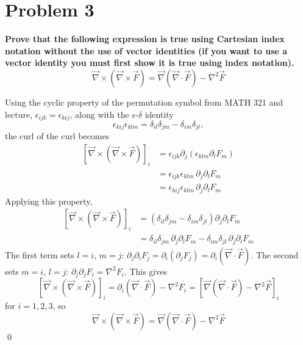 \documentclass[12pt]{article}
\begin{document}
\newpage

\section*{Problem 3}
\textbf{Prove that the following expression is true using Cartesian index notation without the use of vector identities (if you want to use a vector identity you must first show it is true using index notation).}
\begin{equation*}
    \vec\nabla \times \left(\vec\nabla \times \vec F\right) = \vec\nabla\left(\vec\nabla \cdot \vec F\right) - \nabla^2 \vec F
\end{equation*}

Using the cyclic property of the permutation symbol from MATH 321 and lecture, $\epsilon_{ijk} = \epsilon_{kij}$, along with the $\epsilon$-$\delta$ identity
\begin{equation}
    \epsilon_{kij}\epsilon_{klm} = \delta_{il}\delta_{jm} - \delta_{im}\delta_{jl}, \label{eq:epsdelta}
\end{equation}
the curl of the curl becomes
\begin{align*}
    \left[\vec\nabla\times\left(\vec\nabla\times\vec F\right)\right]_i
    &= \epsilon_{ijk}\partial_j\left(\epsilon_{klm}\partial_lF_m\right) \\
    &= \epsilon_{ijk}\epsilon_{klm}\,\partial_j\partial_lF_m \\
    &= \epsilon_{kij}\epsilon_{klm}\,\partial_j\partial_lF_m
\end{align*}
Applying this property,
\begin{align*}
    \left[\vec\nabla\times\left(\vec\nabla\times\vec F\right)\right]_i
    &= \left(\delta_{il}\delta_{jm} - \delta_{im}\delta_{jl}\right)\partial_j\partial_lF_m \\
    &= \delta_{il}\delta_{jm}\,\partial_j\partial_lF_m - \delta_{im}\delta_{jl}\,\partial_j\partial_lF_m
\end{align*}
The first term sets $l=i$, $m=j$: $\partial_j\partial_iF_j = \partial_i\left(\partial_jF_j\right) = \partial_i\left(\vec\nabla\cdot\vec F\right)$. The second sets $m=i$, $l=j$: $\partial_j\partial_jF_i = \nabla^2F_i$. This gives
\begin{equation*}
    \left[\vec\nabla\times\left(\vec\nabla\times\vec F\right)\right]_i = \partial_i\left(\vec\nabla\cdot\vec F\right) - \nabla^2F_i = \left[\vec\nabla\left(\vec\nabla\cdot\vec F\right) - \nabla^2\vec F\right]_i
\end{equation*}
for $i = 1,2,3$, so
\begin{equation}
    \boxed{\vec\nabla \times \left(\vec\nabla \times \vec F\right) = \vec\nabla\left(\vec\nabla \cdot \vec F\right) - \nabla^2 \vec F}
\end{equation}
\qed
\end{document}
